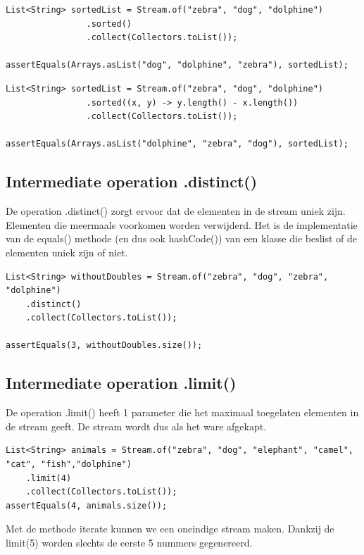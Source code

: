 \documentclass{tstextbook}
\begin{document}
\begin{lstlisting}
List<String> sortedList = Stream.of("zebra", "dog", "dolphine")
				.sorted()
				.collect(Collectors.toList());

assertEquals(Arrays.asList("dog", "dolphine", "zebra"), sortedList);
\end{lstlisting}

\begin{lstlisting}
List<String> sortedList = Stream.of("zebra", "dog", "dolphine")
				.sorted((x, y) -> y.length() - x.length())
				.collect(Collectors.toList());
		
assertEquals(Arrays.asList("dolphine", "zebra", "dog"), sortedList);
\end{lstlisting}

\subsection{Intermediate operation .distinct()}

De operation .distinct() zorgt ervoor dat de elementen in de stream uniek zijn. Elementen die meermaals voorkomen worden verwijderd. Het is de implementatie van de equals() methode (en dus ook hashCode()) van een klasse die beslist of de elementen uniek zijn of niet.

\begin{lstlisting}
List<String> withoutDoubles = Stream.of("zebra", "dog", "zebra", "dolphine")
    .distinct()
    .collect(Collectors.toList());
    
assertEquals(3, withoutDoubles.size());
\end{lstlisting}

\subsection{Intermediate operation .limit()}

De operation .limit() heeft 1 parameter die het maximaal toegelaten elementen in de stream geeft.
De stream wordt dus als het ware afgekapt.

\begin{lstlisting}
List<String> animals = Stream.of("zebra", "dog", "elephant", "camel", "cat", "fish","dolphine")
    .limit(4)
    .collect(Collectors.toList());
assertEquals(4, animals.size());
\end{lstlisting}

Met de methode iterate kunnen we een oneindige stream maken. Dankzij de limit(5) worden slechts de eerste 5 nummers gegenereerd.
\end{document}
